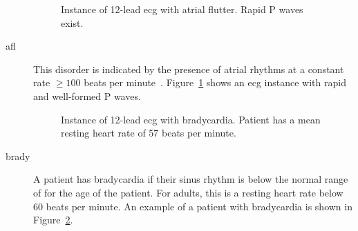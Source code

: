 \documentclass[\main/thesis.tex]{subfiles}
\begin{document}
\begin{description}
    \begin{figure}[H]
        \centering
        \caption{Instance of 12-lead \gls{ecg} with atrial flutter. Rapid P waves exist.}
        \label{fig:full_AFL}
    \end{figure}
    \item[\gls{afl}] This disorder is indicated by the presence of atrial rhythms at a constant rate $\geq 100$ beats per minute~\cite{saoudi_classification_2001}. Figure~\ref{fig:full_AFL} shows an \gls{ecg} instance with rapid and well-formed P waves.

    \begin{figure}[H]
        \centering
        \caption{Instance of 12-lead \gls{ecg} with bradycardia. Patient has a mean resting heart rate of 57 beats per minute.}
        \label{fig:full_Brady}
    \end{figure} 
    \item[\gls{brady}] A patient has bradycardia if their sinus rhythm is below the normal range of for the age of the patient. For adults, this is a resting heart rate below 60 beats per minute. An example of a patient with bradycardia is shown in Figure~\ref{fig:full_Brady}.


\end{description}
\end{document}
